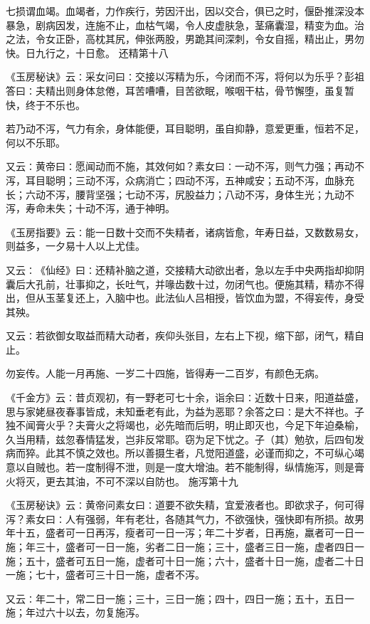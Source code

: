 \documentclass[a4paper,12pt,UTF8,twoside]{ctexbook}
\begin{document}
七损谓血竭。血竭者，力作疾行，劳因汗出，因以交合，俱已之时，偃卧推深没本暴急，剧病因发，连施不止，血枯气竭，令人皮虚肤急，茎痛囊湿，精变为血。治之法，令女正卧，高枕其尻，伸张两股，男跪其间深刺，令女自摇，精出止，男勿快。日九行之，十日愈。
还精第十八

《玉房秘诀》云∶采女问曰∶交接以泻精为乐，今闭而不泻，将何以为乐乎？彭祖答曰∶夫精出则身体怠倦，耳苦嘈嘈，目苦欲眠，喉咽干枯，骨节懈堕，虽复暂快，终于不乐也。

若乃动不泻，气力有余，身体能便，耳目聪明，虽自抑静，意爱更重，恒若不足，何以不乐耶。

又云∶黄帝曰∶愿闻动而不施，其效何如？素女曰∶一动不泻，则气力强；再动不泻，耳目聪明；三动不泻，众病消亡；四动不泻，五神咸安；五动不泻，血脉充长；六动不泻，腰背坚强；七动不泻，尻股益力；八动不泻，身体生光；九动不泻，寿命未失；十动不泻，通于神明。

《玉房指要》云∶能一日数十交而不失精者，诸病皆愈，年寿日益，又数数易女，则益多，一夕易十人以上尤佳。

又云∶《仙经》曰∶还精补脑之道，交接精大动欲出者，急以左手中央两指却抑阴囊后大孔前，壮事抑之，长吐气，并喙齿数十过，勿闭气也。便施其精，精亦不得出，但从玉茎复还上，入脑中也。此法仙人吕相授，皆饮血为盟，不得妄传，身受其殃。

又云∶若欲御女取益而精大动者，疾仰头张目，左右上下视，缩下部，闭气，精自止。

勿妄传。人能一月再施、一岁二十四施，皆得寿一二百岁，有颜色无病。

《千金方》云∶昔贞观初，有一野老可七十余，诣余曰∶近数十日来，阳道益盛，思与家姥昼夜春事皆成，未知垂老有此，为益为恶耶？余答之曰∶是大不祥也。子独不闻膏火乎？夫膏火之将竭也，必先暗而后明，明止即灭也，今足下年迫桑榆，久当用精，兹忽春情猛发，岂非反常耶。窃为足下忧之。子（其）勉欤，后四旬发病而猝。此其不慎之效也。所以善摄生者，凡觉阳道盛，必谨而抑之，不可纵心竭意以自贼也。若一度制得不泄，则是一度大增油。若不能制得，纵情施泻，则是膏火将灭，更去其油，不可不深以自防也。
施泻第十九

《玉房秘诀》云∶黄帝问素女曰∶道要不欲失精，宜爱液者也。即欲求子，何可得泻？素女曰∶人有强弱，年有老壮，各随其气力，不欲强快，强快即有所损。故男年十五，盛者可一日再泻，瘦者可一日一泻；年二十岁者，日再施，羸者可一日一施；年三十，盛者可一日一施，劣者二日一施；三十，盛者三日一施，虚者四日一施；五十，盛者可五日一施，虚者可十日一施；六十，盛者十日一施，虚者二十日一施；七十，盛者可三十日一施，虚者不泻。

又云∶年二十，常二日一施；三十，三日一施；四十，四日一施；五十，五日一施；年过六十以去，勿复施泻。
\end{document}

